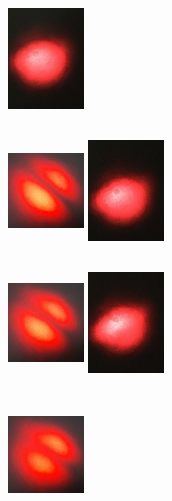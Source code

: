 \documentclass[12pt]{book}
\begin{document}
\begin{figure}[t!]
\begin{subfigure}[b]{0.3\linewidth}
\includegraphics[width=2cm,height=3cm]{images/fotos/62.jpg}
\caption{}
\end{subfigure}
\begin{subfigure}[b]{0.3\linewidth}
\centering
\includegraphics[width=2cm,height=3cm]{images/fotos/71.jpg}
\includegraphics[width=2cm,height=3cm]{images/fotos/52.jpg}
\caption{}
\end{subfigure}
\begin{subfigure}[b]{0.3\linewidth}
\centering
\includegraphics[width=2cm,height=3cm]{images/fotos/81.jpg}
\includegraphics[width=2cm,height=3cm]{images/fotos/42.jpg}
\caption{}
\end{subfigure}
\begin{subfigure}[b]{0.3\linewidth}
\centering
\includegraphics[width=2cm,height=3cm]{images/fotos/91.jpg}

\end{subfigure}
\end{figure}
\end{document}
